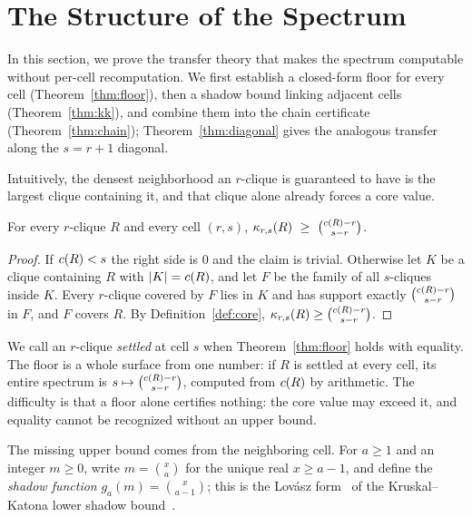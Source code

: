 \section{The Structure of the Spectrum}
\label{sec:theory}

In this section, we prove the transfer theory that makes the spectrum computable without per-cell recomputation.
%
We first establish a closed-form floor for every cell (Theorem~\ref{thm:floor}), then a shadow bound linking adjacent cells (Theorem~\ref{thm:kk}), and combine them into the chain certificate (Theorem~\ref{thm:chain}); Theorem~\ref{thm:diagonal} gives the analogous transfer along the $s=r{+}1$ diagonal.

Intuitively, the densest neighborhood an $r$-clique is guaranteed to have is the largest clique containing it, and that clique alone already forces a core value.

\begin{theorem}
\label{thm:floor}
For every $r$-clique $R$ and every cell $(r,s)$, $\corev{r,s}(R)\ \ge\ \binom{\cliqb(R)-r}{\,s-r\,}$.
\end{theorem}
\begin{proof}
If $c(R)<s$ the right side is $0$ and the claim is trivial.
%
Otherwise let $K$ be a clique containing $R$ with $|K|=c(R)$, and let $F$ be the family of all $s$-cliques inside $K$.
%
Every $r$-clique covered by $F$ lies in $K$ and has support exactly $\binom{c(R)-r}{s-r}$ in $F$, and $F$ covers $R$.
%
By Definition~\ref{def:core}, $\kappa_{r,s}(R)\ge\binom{c(R)-r}{s-r}$.
\end{proof}

We call an $r$-clique \textit{settled} at cell $s$ when Theorem~\ref{thm:floor} holds with equality.
%
The floor is a whole surface from one number: if $R$ is settled at every cell, its entire spectrum is $s\mapsto\binom{c(R)-r}{s-r}$, computed from $c(R)$ by arithmetic.
%
The difficulty is that a floor alone certifies nothing: the core value may exceed it, and equality cannot be recognized without an upper bound.

The missing upper bound comes from the neighboring cell.
%
For $a\ge 1$ and an integer $m\ge 0$, write $m=\binom{x}{a}$ for the unique real $x\ge a-1$, and define the \textit{shadow function} $g_a(m)=\binom{x}{a-1}$; this is the Lov\'{a}sz form~\cite{lovaszKK} of the Kruskal--Katona lower shadow bound~\cite{kruskal1963number, katona1968theorem}.


